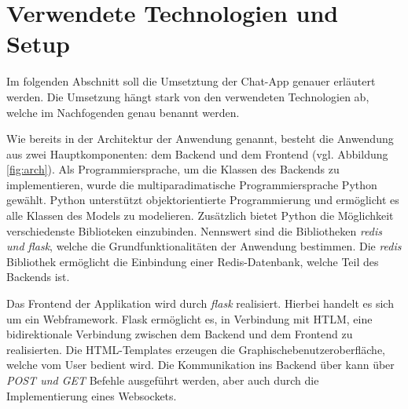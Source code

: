 
\section{Verwendete Technologien und Setup}
Im folgenden Abschnitt soll die Umsetztung der Chat-App genauer erläutert werden.
Die Umsetzung hängt stark von den verwendeten Technologien ab, welche im Nachfogenden genau benannt werden.

Wie bereits in der Architektur der Anwendung genannt, besteht die Anwendung aus zwei Hauptkomponenten: dem Backend und dem Frontend (vgl. Abbildung \ref{fig:arch}).
Als Programmiersprache, um die Klassen des Backends zu implementieren, wurde die multiparadimatische Programmiersprache Python gewählt.
Python unterstützt objektorientierte Programmierung und ermöglicht es alle Klassen des Models zu modelieren. 
Zusätzlich bietet Python die Möglichkeit verschiedenste Biblioteken einzubinden.
Nennswert sind die Bibliotheken \textit{redis und flask}, welche die Grundfunktionalitäten der Anwendung bestimmen. 
Die \textit{redis} Bibliothek ermöglicht die Einbindung einer \acs{Redis}-Datenbank, welche Teil des Backends ist.

Das Frontend der Applikation wird durch \textit{flask} realisiert. Hierbei handelt es sich um ein Webframework.
Flask ermöglicht es, in Verbindung mit HTLM, eine bidirektionale Verbindung zwischen dem Backend und dem Frontend zu realisierten.
Die HTML-Templates erzeugen die Graphischebenutzeroberfläche, welche vom User bedient wird. Die Kommunikation ins Backend über kann über \textit{POST und GET} Befehle ausgeführt werden, aber auch durch die Implementierung eines Websockets.


